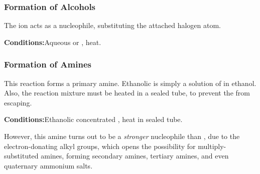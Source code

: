 			\subsubsection{Formation of Alcohols}

				The  ion acts as a nucleophile, substituting the attached halogen atom.

				\vspace{1.5em}
				\vbox{\textbf{Conditions:}\tabto{35mm}Aqueous  or , heat.}

				\diagram[1.0]{
					\schemestart[0, 1.5, thick]
						\chemfig{!\molR-[:0]!\molX}
						\hspace{2mm} + \hspace{2mm}
						\chemfig{!\molOH\mch}
						\arrow
						\chemfig{!\molR-[:0]!\molOH}
						\hspace{2mm} + \hspace{2mm}
						\chemfig{!\molX\mch}
					\schemestop
				}


			\hypertarget{NucleophilicSubstitutionFormingAmines}{}
			\subsubsection{Formation of Amines}

				This reaction forms a primary amine. Ethanolic  is simply a solution of  in ethanol. Also, the reaction
				mixture must be heated in a sealed tube, to prevent the  from escaping.

				\vspace{1.5em}
				\vbox{\textbf{Conditions:}\tabto{35mm}Ethanolic concentrated , heat in sealed tube.}



				However, this amine turns out to be a \textit{stronger} nucleophile than , due to the electron-donating alkyl groups,
				which opens the possibility for multiply-substituted amines, forming secondary amines, tertiary amines, and even
				quaternary ammonium salts.

